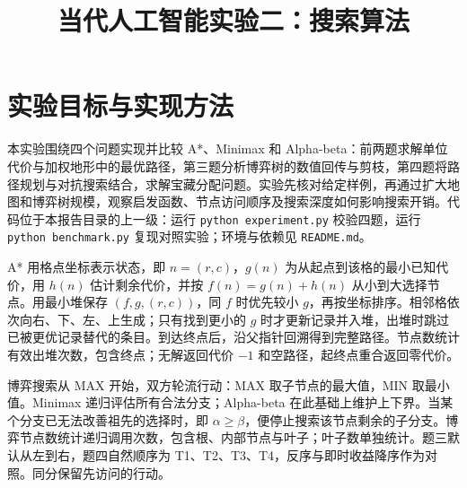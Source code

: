 \documentclass[UTF8,a4paper,zihao=5]{ctexart}
\title{当代人工智能实验二：搜索算法}\author{}\date{}
\begin{document}
\maketitle\vspace{-22mm}
\section{实验目标与实现方法}
本实验围绕四个问题实现并比较 A*、Minimax 和 Alpha-beta：前两题求解单位代价与加权地形中的最优路径，第三题分析博弈树的数值回传与剪枝，第四题将路径规划与对抗搜索结合，求解宝藏分配问题。实验先核对给定样例，再通过扩大地图和博弈树规模，观察启发函数、节点访问顺序及搜索深度如何影响搜索开销。代码位于本报告目录的上一级：运行 \texttt{python experiment.py} 校验四题，运行 \texttt{python benchmark.py} 复现对照实验；环境与依赖见 \texttt{README.md}。

A* 用格点坐标表示状态，即 $n=(r,c)$，$g(n)$ 为从起点到该格的最小已知代价，用 $h(n)$ 估计剩余代价，并按 $f(n)=g(n)+h(n)$ 从小到大选择节点。用最小堆保存 $(f,g,(r,c))$，同 $f$ 时优先较小 $g$，再按坐标排序。相邻格依次向右、下、左、上生成；只有找到更小的 $g$ 时才更新记录并入堆，出堆时跳过已被更优记录替代的条目。到达终点后，沿父指针回溯得到完整路径。节点数统计有效出堆次数，包含终点；无解返回代价 $-1$ 和空路径，起终点重合返回零代价。

博弈搜索从 MAX 开始，双方轮流行动：MAX 取子节点的最大值，MIN 取最小值。Minimax 递归评估所有合法分支；Alpha-beta 在此基础上维护上下界。当某个分支已无法改善祖先的选择时，即 $\alpha\geq\beta$，便停止搜索该节点剩余的子分支。博弈节点数统计递归调用次数，包含根、内部节点与叶子；叶子数单独统计。题三默认从左到右，题四自然顺序为 T1、T2、T3、T4，反序与即时收益降序作为对照。同分保留先访问的行动。
\end{document}
